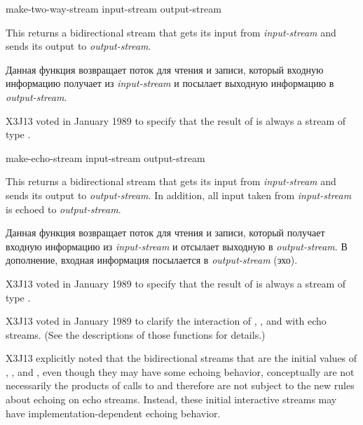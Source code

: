 \begin{defun}[Function]
make-two-way-stream input-stream output-stream

This returns a bidirectional stream that gets its input from \emph{input-stream}
and sends its output to \emph{output-stream}.

Данная функция возвращает поток для чтения и записи, который входную информацию
получает из \emph{input-stream} и посылает выходную информацию в \emph{output-stream}.
\begin{new}
X3J13 voted in January 1989
to specify that the result of
 is always a stream of type .
\end{new}
\end{defun}

\begin{defun}[Function]
make-echo-stream input-stream output-stream

This returns a bidirectional stream that gets its input from \emph{input-stream}
and sends its output to \emph{output-stream}.  In addition, all
input taken from \emph{input-stream} is echoed to \emph{output-stream}.

Данная функция возвращает поток для чтения и записи, который получает входную
информацию из \emph{input-stream} и отсылает выходную в \emph{output-stream}. В
дополнение, входная информация посылается в \emph{output-stream} (эхо).
\begin{new}
X3J13 voted in January 1989
to specify that the result of
 is always a stream of type .
\end{new}

\begin{new}
X3J13 voted in January 1989
to clarify the interaction of
, , and  with echo streams.
(See the descriptions of those functions for details.)

X3J13 explicitly noted that the bidirectional streams that are the initial
values of , , and ,
even though they may have some echoing behavior, conceptually
are not necessarily the products of calls to 
and therefore are not subject to the new rules about echoing on echo
streams.  Instead, these initial interactive streams may have
implementation-dependent echoing behavior.
\end{new}
\end{defun}

